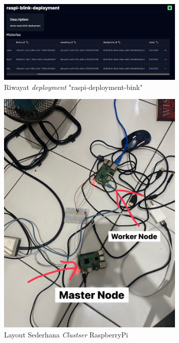 \begin{figure}[ht]
  \centering
  \includegraphics[width=0.8\textwidth]{resources/chapter-4/pengujian/pengujian-sistem-raspi-10.jpg}
  \caption{Riwayat \textit{deployment} "raspi-deployment-bink"}
  \label{fig:pengujian-sistem-raspi-10}
\end{figure}

\begin{figure}[ht]
  \centering
  \includegraphics[width=0.8\textwidth]{resources/chapter-4/pengujian/pengujian-sistem-raspi-layout.jpg}
  \caption{Layout Sederhana \textit{Clustser} RaspberryPi}
  \label{fig:pengujian-sistem-raspi-layout}
\end{figure}

